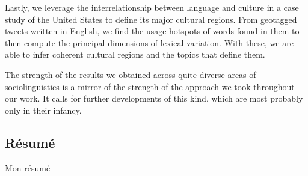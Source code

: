 \documentclass[../thesis.tex]{subfiles}
\begin{document}
Lastly, we leverage the interrelationship between language and culture in a case study
of the United States to define its major cultural regions. From geotagged tweets written
in English, we find the usage hotspots of words found in them to then compute the
principal dimensions of lexical variation. With these, we are able to infer coherent
cultural regions and the topics that define them.

The strength of the results we obtained across quite diverse areas of sociolinguistics
is a mirror of the strength of the approach we took throughout our work. It calls for
further developments of this kind, which are most probably only in their infancy. 

\clearpage

\begin{otherlanguage}{french}
\chapter*{Résumé}
Mon résumé
\end{otherlanguage}

\endgroup

\vfill
\end{document}
